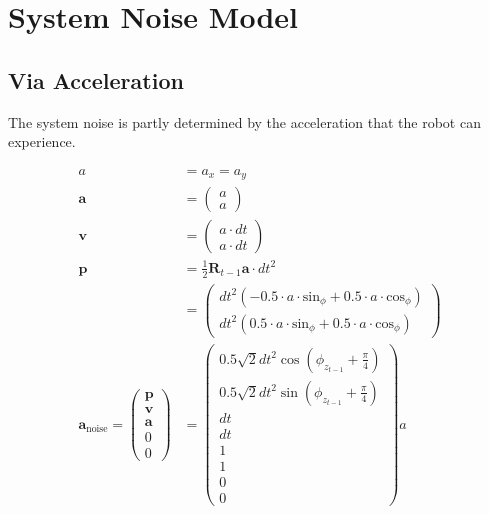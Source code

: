\documentclass{article}
\begin{document}
\section{System Noise Model}
\subsection{Via Acceleration}

The system noise is partly determined by the acceleration that the robot can experience.

\begin{align}
  a &= a_x = a_y \\
  \textbf{a} &= \left(\begin{matrix}a\\a\end{matrix}\right) \\
  \textbf{v} &= \left(\begin{matrix}a \cdot dt\\a \cdot dt\end{matrix}\right) \\
  \textbf{p} &= \frac{1}{2}\textbf{R}_{t-1}\textbf{a} \cdot dt^2 \\ 
  &= \left(\begin{matrix}dt^{2} \left(- 0.5 \cdot a \cdot \textrm{sin}_\phi + 0.5 \cdot a \cdot \textrm{cos}_\phi\right)\\dt^{2} \left(0.5 \cdot a \cdot \textrm{sin}_\phi + 0.5 \cdot a \cdot \textrm{cos}_\phi\right)\end{matrix}\right) \\
  \textbf{a}_{\textrm{noise}} =
  \left(\begin{matrix}
    \textbf{p} \\
    \textbf{v} \\
    \textbf{a} \\
    0 \\
    0
  \end{matrix}\right)
&=\left(\begin{matrix}0.5 \sqrt{2} dt^{2} \cos{\left(\phi_{z_{t-1}} + \frac{\pi}{4} \right)}\\0.5 \sqrt{2} dt^{2} \sin{\left(\phi_{z_{t-1}} + \frac{\pi}{4} \right)}\\dt\\dt\\1\\1\\0\\0\end{matrix}\right) a
\end{align}
\end{document}
